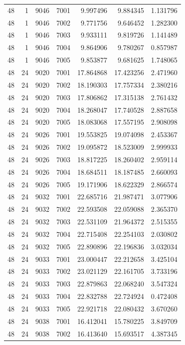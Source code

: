 \begin{table}
\begin{tabular}{rrrrrrr}
48 & 1 & 9046 & 7001 & 9.997496 & 9.884345 & 1.131796 \\
48 & 1 & 9046 & 7002 & 9.771756 & 9.646452 & 1.282300 \\
48 & 1 & 9046 & 7003 & 9.933111 & 9.819726 & 1.141489 \\
48 & 1 & 9046 & 7004 & 9.864906 & 9.780267 & 0.857987 \\
48 & 1 & 9046 & 7005 & 9.853877 & 9.681625 & 1.748065 \\
48 & 24 & 9020 & 7001 & 17.864868 & 17.423256 & 2.471960 \\
48 & 24 & 9020 & 7002 & 18.190303 & 17.757334 & 2.380216 \\
48 & 24 & 9020 & 7003 & 17.806862 & 17.315138 & 2.761432 \\
48 & 24 & 9020 & 7004 & 18.268047 & 17.740528 & 2.887658 \\
48 & 24 & 9020 & 7005 & 18.083068 & 17.557195 & 2.908098 \\
48 & 24 & 9026 & 7001 & 19.553825 & 19.074098 & 2.453367 \\
48 & 24 & 9026 & 7002 & 19.095872 & 18.523009 & 2.999933 \\
48 & 24 & 9026 & 7003 & 18.817225 & 18.260402 & 2.959114 \\
48 & 24 & 9026 & 7004 & 18.684511 & 18.187485 & 2.660093 \\
48 & 24 & 9026 & 7005 & 19.171906 & 18.622329 & 2.866574 \\
48 & 24 & 9032 & 7001 & 22.685716 & 21.987471 & 3.077906 \\
48 & 24 & 9032 & 7002 & 22.593508 & 22.059088 & 2.365370 \\
48 & 24 & 9032 & 7003 & 22.531109 & 21.964372 & 2.515355 \\
48 & 24 & 9032 & 7004 & 22.715408 & 22.254103 & 2.030802 \\
48 & 24 & 9032 & 7005 & 22.890896 & 22.196836 & 3.032034 \\
48 & 24 & 9033 & 7001 & 23.000447 & 22.212658 & 3.425104 \\
48 & 24 & 9033 & 7002 & 23.021129 & 22.161705 & 3.733196 \\
48 & 24 & 9033 & 7003 & 22.879863 & 22.068240 & 3.547324 \\
48 & 24 & 9033 & 7004 & 22.832788 & 22.724924 & 0.472408 \\
48 & 24 & 9033 & 7005 & 22.921718 & 22.080432 & 3.670260 \\
48 & 24 & 9038 & 7001 & 16.412041 & 15.780225 & 3.849709 \\
48 & 24 & 9038 & 7002 & 16.413640 & 15.693517 & 4.387345 \\

\end{tabular}
\end{table}
